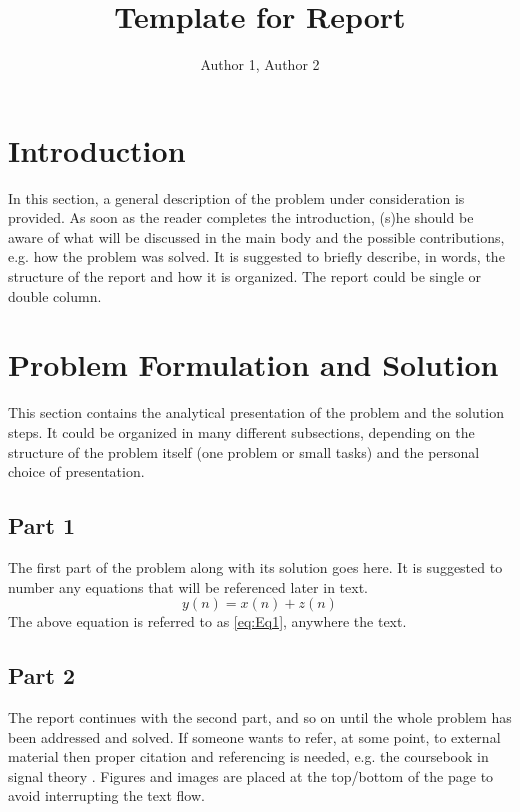 \documentclass[onecolumn, 12pt]{IEEEtran}
\begin{document}
\title{Template for Report}
\author{Author 1, Author 2}

\maketitle

\section{Introduction}
In this section, a general description of the problem under consideration is provided. 
As soon as the reader completes the introduction, (s)he should be aware of what will 
be discussed in the main body and the possible contributions, e.g. how the problem was 
solved. It is suggested to briefly describe, in words, the structure of the report and 
how it is organized. The report could be single or double column.

\section{Problem Formulation and Solution}
This section contains the analytical presentation of the problem and the solution steps. 
It could be organized in many different subsections, depending on the structure of the 
problem itself (one problem or small tasks) and the personal choice of presentation.

\subsection{Part 1}
The first part of the problem along with its solution goes here. It is suggested to number 
any equations that will be referenced later in text.
\begin{equation} \label{eq:Eq1}
y(n)=x(n)+z(n)
\end{equation}
The above equation is referred to as \eqref{eq:Eq1}, anywhere the text. 

\subsection{Part 2}
The report continues with the second part, and so on until the whole problem has been 
addressed and solved. If someone wants to refer, at some point, to external material 
then proper citation and referencing is needed, e.g. the coursebook in signal theory 
\cite{HanOttHjalm}. Figures and images are placed at the top/bottom of the page to 
avoid interrupting the text flow.
\end{document}
